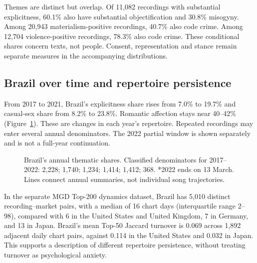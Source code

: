 \documentclass[10pt,a4paper,twocolumn]{article}
\begin{document}
Themes are distinct but overlap. Of 11,082 recordings with substantial explicitness, 60.1\% also have substantial objectification and 30.8\% misogyny. Among 20,943 materialism-positive recordings, 40.7\% also code crime. Among 12,704 violence-positive recordings, 78.3\% also code crime. These conditional shares concern texts, not people. Consent, representation and stance remain separate measures in the accompanying distributions.

\subsection{Brazil over time and repertoire persistence}
From 2017 to 2021, Brazil's explicitness share rises from 7.0\% to 19.7\% and casual-sex share from 8.2\% to 23.8\%. Romantic affection stays near 40--42\% (Figure~\ref{fig:brazil}). These are changes in each year's repertoire. Repeated recordings may enter several annual denominators. The 2022 partial window is shown separately and is not a full-year continuation.

\begin{figure}[t]
\centering
{}
\caption{Brazil's annual thematic shares. Classified denominators for 2017--2022: 2,228; 1,740; 1,234; 1,414; 1,412; 368. *2022 ends on 13 March. Lines connect annual summaries, not individual song trajectories.}
\label{fig:brazil}
\end{figure}

In the separate MGD Top-200 dynamics dataset, Brazil has 5,010 distinct recording--market pairs, with a median of 16 chart days (interquartile range 2--98), compared with 6 in the United States and United Kingdom, 7 in Germany, and 13 in Japan. Brazil's mean Top-50 Jaccard turnover is 0.069 across 1,892 adjacent daily chart pairs, against 0.114 in the United States and 0.032 in Japan. This supports a description of different repertoire persistence, without treating turnover as psychological anxiety.
\end{document}
